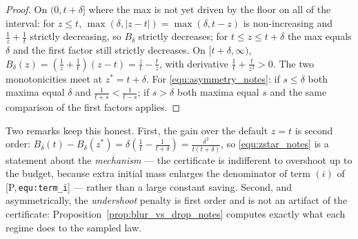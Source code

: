 \documentclass[11pt]{article}
\theoremstyle{definition}
\theoremstyle{remark}
\newcommand{\paperref}[1]{[P,\,\texttt{#1}]}   %
\begin{document}
\begin{proof}
On $(0,t+\delta]$ where the max is not yet driven by the floor on all of the interval:
for $z\leq t$, $\max(\delta,|z-t|)=\max(\delta,t-z)$ is non-increasing and $\frac1z+\frac1t$
strictly decreasing, so $B_\delta$ strictly decreases; for $t\leq z\leq t+\delta$ the max
equals $\delta$ and the first factor still strictly decreases. On $[t+\delta,\infty)$,
$B_\delta(z)=\left(\frac1z+\frac1t\right)(z-t)=\frac zt-\frac tz$, with derivative
$\frac1t+\frac t{z^2}>0$. The two monotonicities meet at $z^*=t+\delta$. For
\eqref{equ:asymmetry_notes}: if $s\leq\delta$ both maxima equal $\delta$ and
$\frac1{t+s}<\frac1{t-s}$; if $s>\delta$ both maxima equal $s$ and the same comparison of
the first factors applies.
\end{proof}

Two remarks keep this honest. First, the gain over the default $z=t$ is second order:
$B_\delta(t)-B_\delta(z^*)=\delta\left(\frac1t-\frac1{t+\delta}\right)
=\frac{\delta^2}{t(t+\delta)}$, so \eqref{equ:zstar_notes} is a statement about the
\emph{mechanism} --- the certificate is indifferent to overshoot up to the budget, because
extra initial mass enlarges the denominator of term $(i)$ of
\paperref{equ:term\_i} --- rather than a large constant saving. Second, and asymmetrically,
the \emph{undershoot} penalty is first order and is not an artifact of the certificate:
Proposition~\ref{prop:blur_vs_drop_notes} computes exactly what each regime does to the sampled
law.
\end{document}
